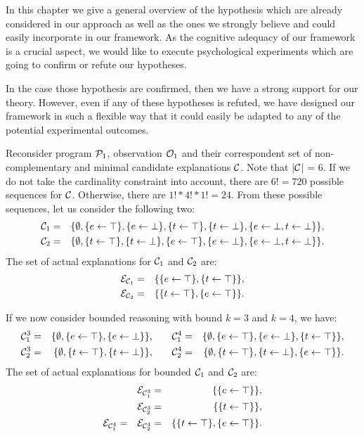 In this chapter we give a general overview of the hypothesis which are already considered in our approach as well as the ones we strongly believe and could easily incorporate in our framework. As the cognitive adequacy of our framework is a crucial aspect, we would like to execute psychological experiments which are going to confirm or refute our hypotheses.

In the case those hypothesis are confirmed, then we have a strong support for our theory. However, even if any of these hypotheses is refuted, we have designed our framework in such a flexible way that it could easily be adapted to any of the potential experimental outcomes.

\newpage
\vspace*{\fill}
\begin{tcolorbox}
\begin{example}
\label{example:bound}
\normalfont 
Reconsider program $\mathcal{P}_1$, observation $\mathcal{O}_1$ and their correspondent set of non-complementary and minimal candidate explanations $\mathcal{C}$. Note that |$\mathcal{C}$| = 6. If we do not take the cardinality constraint into account, there are $6! = 720$ possible sequences for $\mathcal{C}$. Otherwise, there are $1!*4!*1! = 24$. From these possible sequences, let us consider the following two:
\[
\begin{aligned}
\mathcal{C}_1 & = & \{\emptyset, \{e \leftarrow \top\}, \{e \leftarrow \bot\}, \{t \leftarrow \top\}, \{t \leftarrow \bot\}, \{e \leftarrow \bot, t \leftarrow \bot\}  \},\\
\mathcal{C}_2 & = & \{\emptyset, \{t \leftarrow \top\}, \{t \leftarrow \bot\}, \{e \leftarrow \top\}, \{e \leftarrow \bot\}, \{e \leftarrow \bot, t \leftarrow \bot\}  \}.
\end{aligned}
\]
The set of actual explanations for $\mathcal{C}_1$ and $\mathcal{C}_2$ are:
\[
\begin{aligned}
\mathcal{E}_{\mathcal{C}_1} & = & \{ \{e \leftarrow \top\}, \{t \leftarrow \top\}\}, \\
\mathcal{E}_{\mathcal{C}_2} & = & \{ \{t \leftarrow \top\}, \{e \leftarrow \top\}\}. 
\end{aligned}
\]

If we now consider bounded reasoning with bound $k = 3$ and $k = 4$, we have: 
\[
\begin{aligned}
\mathcal{C}_1^3 & = & \{\emptyset, \{e \leftarrow \top\}, \{e \leftarrow \bot\}\}, &\quad& \mathcal{C}_1^4 & = & \{\emptyset, \{e \leftarrow \top\}, \{e \leftarrow \bot\}, \{t \leftarrow \top\}\},\\
\mathcal{C}_2^3 & = & \{\emptyset, \{t \leftarrow \top\}, \{t \leftarrow \bot\}\}, &\quad& \mathcal{C}_2^4 & = & \{\emptyset, \{t \leftarrow \top\}, \{t \leftarrow \bot\}, \{e \leftarrow \top\}\}.
\end{aligned}
\]
The set of actual explanations for bounded $\mathcal{C}_1$ and $\mathcal{C}_2$ are:
\[
\begin{aligned}
&&\mathcal{E}_{\mathcal{C}_1^3} & = & \{ \{e \leftarrow \top\}\}, \\
&&\mathcal{E}_{\mathcal{C}_2^3} & = & \{ \{t \leftarrow \top\}\}, \\
\mathcal{E}_{\mathcal{C}_1^4} & = & \mathcal{E}_{\mathcal{C}_2^4} & = & \{ \{t \leftarrow \top\}, \{e \leftarrow \top\}\}. 
\end{aligned}
\]


\end{example}
\end{tcolorbox}
